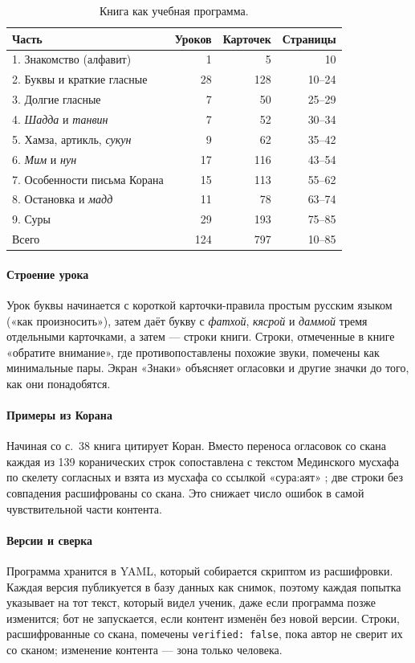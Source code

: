 \begin{table}[ht]
\centering\small
\caption{Книга как учебная программа.}
\label{tab:book}
\begin{tabular}{@{}lrrr@{}}
\toprule
Часть & Уроков & Карточек & Страницы \\
\midrule
1. Знакомство (алфавит) & 1 & 5 & 10 \\
2. Буквы и краткие гласные & 28 & 128 & 10--24 \\
3. Долгие гласные & 7 & 50 & 25--29 \\
4. \emph{Шадда} и \emph{танвин} & 7 & 52 & 30--34 \\
5. Хамза, артикль, \emph{сукун} & 9 & 62 & 35--42 \\
6. \emph{Мим} и \emph{нун} & 17 & 116 & 43--54 \\
7. Особенности письма Корана & 15 & 113 & 55--62 \\
8. Остановка и \emph{мадд} & 11 & 78 & 63--74 \\
9. Суры & 29 & 193 & 75--85 \\
\midrule
Всего & 124 & 797 & 10--85 \\
\bottomrule
\end{tabular}
\end{table}

\paragraph{Строение урока} Урок буквы начинается с короткой карточки-правила простым русским языком («как
произносить»), затем даёт букву с \emph{фатхой}, \emph{кясрой} и \emph{даммой} тремя отдельными карточками, а
затем --- строки книги. Строки, отмеченные в книге «обратите внимание», где противопоставлены похожие
звуки, помечены как минимальные пары. Экран «Знаки» объясняет огласовки и другие значки до того, как они
понадобятся.

\paragraph{Примеры из Корана} Начиная со с.~38 книга цитирует Коран. Вместо переноса огласовок со скана
каждая из 139 коранических строк сопоставлена с текстом Мединского мусхафа по скелету согласных и взята из
мусхафа со ссылкой «сура:аят» \cite{SRC-041}; две строки без совпадения расшифрованы со скана. Это снижает
число ошибок в самой чувствительной части контента.

\paragraph{Версии и сверка} Программа хранится в YAML, который собирается скриптом из расшифровки. Каждая
версия публикуется в базу данных как снимок, поэтому каждая попытка указывает на тот текст, который видел
ученик, даже если программа позже изменится; бот не запускается, если контент изменён без новой версии.
Строки, расшифрованные со скана, помечены \texttt{verified: false}, пока автор не сверит их со сканом;
изменение контента --- зона только человека.

